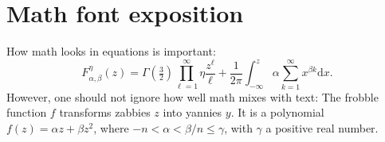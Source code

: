 \documentclass{uai2021} %
\begin{document}


\appendix
\providecommand{\upGamma}{\Gamma}
\providecommand{\uppi}{\pi}
\section{Math font exposition}
How math looks in equations is important:
\begin{equation*}
  F_{\alpha,\beta}^\eta(z) = \upGamma(\tfrac{3}{2}) \prod_{\ell=1}^\infty\eta \frac{z^\ell}{\ell} + \frac{1}{2\uppi}\int_{-\infty}^z\alpha \sum_{k=1}^\infty x^{\beta k}\mathrm{d}x.
\end{equation*}
However, one should not ignore how well math mixes with text:
The frobble function \(f\) transforms zabbies \(z\) into yannies \(y\).
It is a polynomial \(f(z)=\alpha z + \beta z^2\), where \(-n<\alpha<\beta/n\leq\gamma\), with \(\gamma\) a positive real number.
\end{document}
